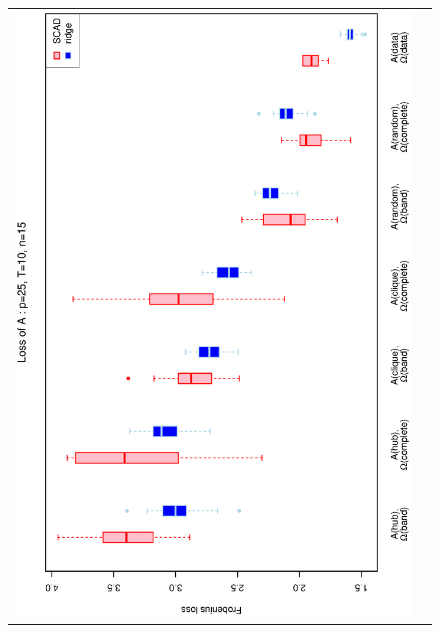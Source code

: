 \begin{figure}[h!]
\centering
\begin{tabular}{cc}
\includegraphics[scale=0.45,angle=270]{LossA25T10N15_25.eps}
\\

\end{tabular}
\end{figure}
